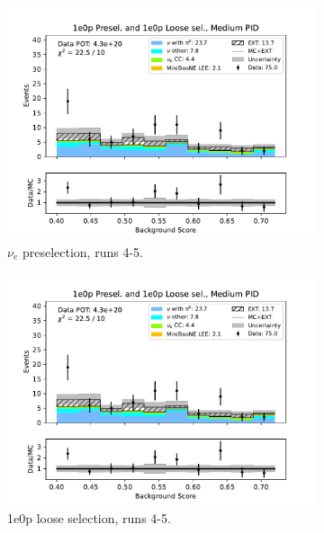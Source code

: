 \begin{figure}[H]
\begin{subfigure}{0.5\linewidth}
        \includegraphics[width=\linewidth]{technote/Sidebands/Figures/NearSideband/near_sideband_bkg_score_run4b4c4d5_ZP_ZPLOOSESEL_MEDIUM_PID.pdf}
        \caption{$\nu_e$ preselection, runs 4-5.}
    \end{subfigure}%
    \begin{subfigure}{0.5\linewidth}
        \includegraphics[width=\linewidth]{technote/Sidebands/Figures/NearSideband/near_sideband_bkg_score_run4b4c4d5_ZP_ZPLOOSESEL_MEDIUM_PID.pdf}
        \caption{1e0p loose selection, runs 4-5.}
    \end{subfigure}    
    \begin{subfigure}{0.5\linewidth}

\end{subfigure}
\end{figure}
